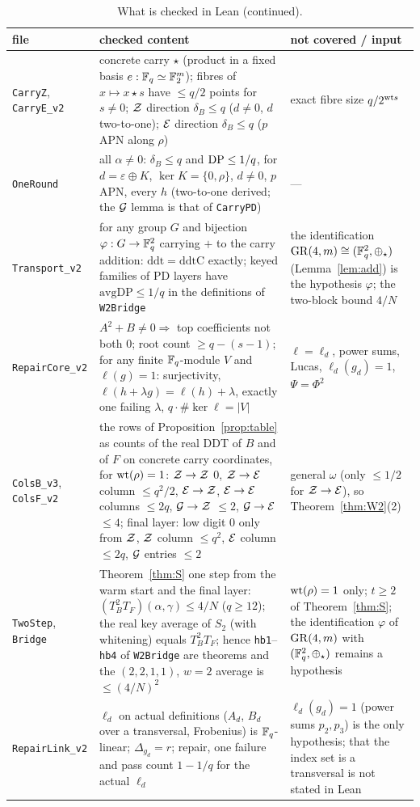 \begin{table}[!htbp]\footnotesize
\caption{What is checked in Lean (continued).}\label{tab:lean2}
\begin{tabular}{p{}p{}p{}}
\toprule
file & checked content & not covered / input\\
\midrule
\texttt{CarryZ}, \texttt{CarryE\_v2} & concrete carry $\star$ (product in a fixed basis $e:\mathbb{F}_q\simeq\mathbb{F}_2^m$); fibres of $x\mapsto x\star s$ have $\le q/2$ points for $s\ne0$; $\mathcal{Z}$ direction $\delta_B\le q$ ($d\ne0$, $d$ two-to-one); $\mathcal{E}$ direction $\delta_B\le q$ ($p$ APN along $\rho$) & exact fibre size $q/2^{\mathrm{wt} s}$\\
\texttt{OneRound} & all $\alpha\ne0$: $\delta_B\le q$ and $\mathrm{DP}\le1/q$, for $d=\varepsilon\oplus K$, $\ker K=\{0,\rho\}$, $d\ne0$, $p$ APN, every $h$ (two-to-one derived; the $\mathcal{G}$ lemma is that of \texttt{CarryPD}) & ---\\
\texttt{Transport\_v2} & for any group $G$ and bijection $\varphi:G\to\mathbb{F}_q^2$ carrying $+$ to the carry addition: $\mathrm{ddt}=\mathrm{ddtC}$ exactly; keyed families of PD layers have $\mathrm{avgDP}\le1/q$ in the definitions of \texttt{W2Bridge} & the identification $\mathrm{GR}(4,m)\cong(\mathbb{F}_q^2,\oplus_\star)$ (Lemma~\ref{lem:add}) is the hypothesis $\varphi$; the two-block bound $4/N$\\
\texttt{RepairCore\_v2} & $A^2+B\ne0\Rightarrow$ top coefficients not both $0$; root count $\ge q-(s-1)$; for any finite $\mathbb{F}_q$-module $V$ and $\ell(g)=1$: surjectivity, $\ell(h+\lambda g)=\ell(h)+\lambda$, exactly one failing $\lambda$, $q\cdot\#\ker\ell=|V|$ & $\ell=\ell_d$, power sums, Lucas, $\ell_d(g_d)=1$, $\Psi=\Phi^2$\\
\texttt{ColsB\_v3}, \texttt{ColsF\_v2} & the rows of Proposition~\ref{prop:table} as counts of the real DDT of $B$ and of $F$ on concrete carry coordinates, for $\mathrm{wt}(\rho)=1$: $\mathcal{Z}\to\mathcal{Z}$ $0$, $\mathcal{Z}\to\mathcal{E}$ column $\le q^2/2$, $\mathcal{E}\to\mathcal{Z}$, $\mathcal{E}\to\mathcal{E}$ columns $\le2q$, $\mathcal{G}\to\mathcal{Z}$ $\le2$, $\mathcal{G}\to\mathcal{E}$ $\le4$; final layer: low digit $0$ only from $\mathcal{Z}$, $\mathcal{Z}$ column $\le q^2$, $\mathcal{E}$ column $\le2q$, $\mathcal{G}$ entries $\le2$ & general $\omega$ (only $\le1/2$ for $\mathcal{Z}\to\mathcal{E}$), so Theorem~\ref{thm:W2}(2)\\
\texttt{TwoStep}, \texttt{Bridge} & Theorem~\ref{thm:S} one step from the warm start and the final layer: $(T_B^2T_F)(\alpha,\gamma)\le4/N$ ($q\ge12$); the real key average of $S_2$ (with whitening) equals $T_B^2T_F$; hence \texttt{hb1}--\texttt{hb4} of \texttt{W2Bridge} are theorems and the $(2,2,1,1)$, $w=2$ average is $\le(4/N)^2$ & $\mathrm{wt}(\rho)=1$ only; $t\ge2$ of Theorem~\ref{thm:S}; the identification $\varphi$ of $\mathrm{GR}(4,m)$ with $(\mathbb{F}_q^2,\oplus_\star)$ remains a hypothesis\\
\texttt{RepairLink\_v2} & $\ell_d$ on actual definitions ($A_d$, $B_d$ over a transversal, Frobenius) is $\mathbb{F}_q$-linear; $\Delta_{g_d}=r$; repair, one failure and pass count $1-1/q$ for the actual $\ell_d$ & $\ell_d(g_d)=1$ (power sums $p_2,p_3$) is the only hypothesis; that the index set is a transversal is not stated in Lean\\
\bottomrule
\end{tabular}
\end{table}
